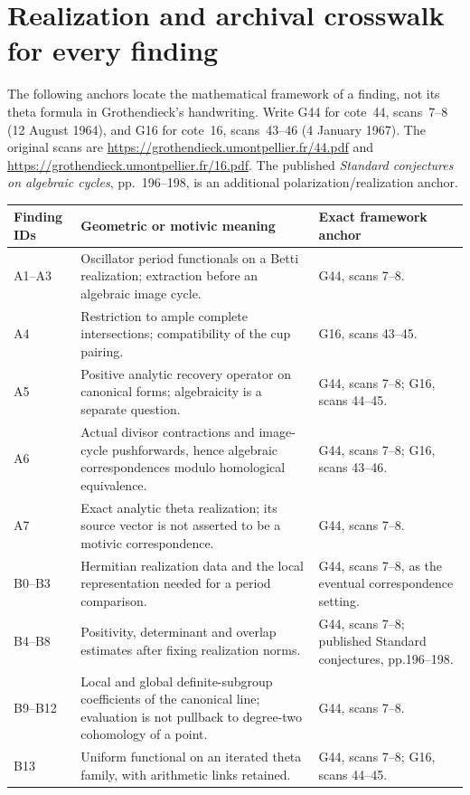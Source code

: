 \appendix
\section{Realization and archival crosswalk for every finding}

The following anchors locate the mathematical framework of a
finding, not its theta formula in Grothendieck's handwriting.
Write G44 for cote~44, scans~7--8 (12 August 1964), and G16 for
cote~16, scans~43--46 (4 January 1967). The original scans are
\url{https://grothendieck.umontpellier.fr/44.pdf} and
\url{https://grothendieck.umontpellier.fr/16.pdf}.
The published \emph{Standard conjectures on algebraic cycles},
pp.~196--198, is an additional polarization/realization anchor.

\begin{longtable}{@{}p{.18\linewidth}p{.48\linewidth}p{.27\linewidth}@{}}
\toprule Finding IDs & Geometric or motivic meaning & Exact framework anchor\\\midrule\endhead
A1--A3 & Oscillator period functionals on a Betti realization; extraction before an algebraic image cycle. & G44, scans 7--8.\\
A4 & Restriction to ample complete intersections; compatibility of the cup pairing. & G16, scans 43--45.\\
A5 & Positive analytic recovery operator on canonical forms; algebraicity is a separate question. & G44, scans 7--8; G16, scans 44--45.\\
A6 & Actual divisor contractions and image-cycle pushforwards, hence algebraic correspondences modulo homological equivalence. & G44, scans 7--8; G16, scans 43--46.\\
A7 & Exact analytic theta realization; its source vector is not asserted to be a motivic correspondence. & G44, scans 7--8.\\
B0--B3 & Hermitian realization data and the local representation needed for a period comparison. & G44, scans 7--8, as the eventual correspondence setting.\\
B4--B8 & Positivity, determinant and overlap estimates after fixing realization norms. & G44, scans 7--8; published Standard conjectures, pp.196--198.\\
B9--B12 & Local and global definite-subgroup coefficients of the canonical line; evaluation is not pullback to degree-two cohomology of a point. & G44, scans 7--8.\\
B13 & Uniform functional on an iterated theta family, with arithmetic links retained. & G44, scans 7--8; G16, scans 44--45.\\

\end{longtable}
